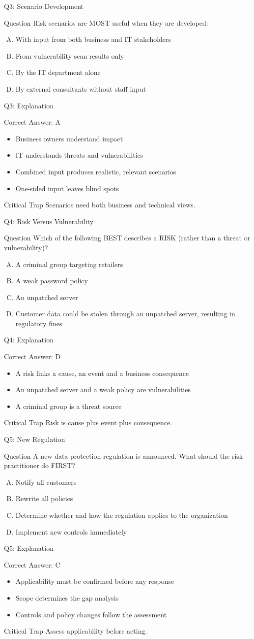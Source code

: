 \documentclass[aspectratio=169]{beamer}
\newcommand{\hq}[7]{%
	\begin{frame}{Q#1: #2}
		\begin{block}{Question}
			#3
		\end{block}
		\begin{enumerate}[(A)]
			#4
		\end{enumerate}
	\end{frame}
	\begin{frame}{Q#1: Explanation}
		\begin{block}{Correct Answer: #5}
			\begin{itemize}
				#6
			\end{itemize}
		\end{block}
		\begin{alertblock}{Critical Trap}
			#7
		\end{alertblock}
	\end{frame}
}
\begin{document}
	\hq{3}{Scenario Development}
	{Risk scenarios are MOST useful when they are developed:}
	{\item With input from both business and IT stakeholders
		\item From vulnerability scan results only
		\item By the IT department alone
		\item By external consultants without staff input}
	{A}
	{\item Business owners understand impact
		\item IT understands threats and vulnerabilities
		\item Combined input produces realistic, relevant scenarios
		\item One-sided input leaves blind spots}
	{Scenarios need both business and technical views.}
	
	\hq{4}{Risk Versus Vulnerability}
	{Which of the following BEST describes a RISK (rather than a threat or vulnerability)?}
	{\item A criminal group targeting retailers
		\item A weak password policy
		\item An unpatched server
		\item Customer data could be stolen through an unpatched server, resulting in regulatory fines}
	{D}
	{\item A risk links a cause, an event and a business consequence
		\item An unpatched server and a weak policy are vulnerabilities
		\item A criminal group is a threat source}
	{Risk is cause plus event plus consequence.}
	
	\hq{5}{New Regulation}
	{A new data protection regulation is announced. What should the risk practitioner do FIRST?}
	{\item Notify all customers
		\item Rewrite all policies
		\item Determine whether and how the regulation applies to the organization
		\item Implement new controls immediately}
	{C}
	{\item Applicability must be confirmed before any response
		\item Scope determines the gap analysis
		\item Controls and policy changes follow the assessment}
	{Assess applicability before acting.}
	
\end{document}
